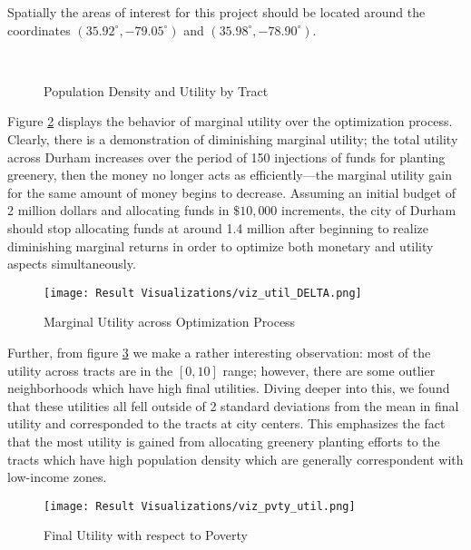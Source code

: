 \documentclass[11pt]{article}
\begin{document}
Spatially the areas of interest for this project should be located around the coordinates $(35.92^{\circ}, -79.05^{\circ})$ and $(35.98^{\circ}, -78.90^{\circ})$.
\begin{figure}[H]
  \centering
   \\
  \caption{Population Density and Utility by Tract} \label{fig:dense_utilx}
\end{figure}
Figure \ref{fig:f} displays the behavior of marginal utility over the optimization process. Clearly, there is a demonstration of diminishing marginal utility; the total utility across Durham increases over the period of 150 injections of funds for planting greenery, then the money no longer acts as efficiently---the marginal utility gain for the same amount of money begins to decrease. Assuming an initial budget of 2 million dollars and allocating funds in $\$10,000$ increments, the city of Durham should stop allocating funds at around 1.4 million after beginning to realize diminishing marginal returns in order to optimize both monetary and utility aspects simultaneously.
\begin{figure}[H]
    \centering
    {\texttt{[image: Result Visualizations/viz\_util\_DELTA.png]}} \\
    \caption{Marginal Utility across Optimization Process} \label{fig:f}
\end{figure}
Further, from figure \ref{fig:pvtyandutil} we make a rather interesting observation: most of the utility across tracts are in the $[0, 10]$ range; however, there are some outlier neighborhoods which have high final utilities. Diving deeper into this, we found that these utilities all fell outside of 2 standard deviations from the mean in final utility and corresponded to the tracts at city centers. This emphasizes the fact that the most utility is gained from allocating greenery planting efforts to the tracts which have high population density which are generally correspondent with low-income zones.
\begin{figure}[H]
    \centering
    {\texttt{[image: Result Visualizations/viz\_pvty\_util.png]}} \\
    \caption{Final Utility with respect to Poverty} \label{fig:pvtyandutil}
\end{figure}
\end{document}
